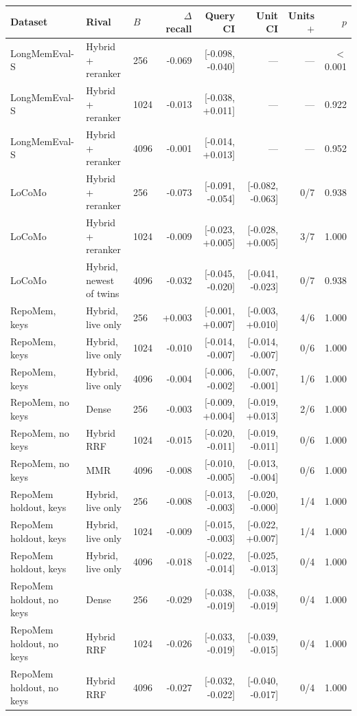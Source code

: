 \begin{tabular}{@{}lllrrrrr@{}}\toprule
Dataset & Rival & $B$ & $\Delta$ recall & Query CI & Unit CI & Units $+$ & $p$ \\\midrule
LongMemEval-S & Hybrid + reranker & 256 & -0.069 & [-0.098, -0.040] & --- & --- & $<$0.001 \\
LongMemEval-S & Hybrid + reranker & 1024 & -0.013 & [-0.038, +0.011] & --- & --- & 0.922 \\
LongMemEval-S & Hybrid + reranker & 4096 & -0.001 & [-0.014, +0.013] & --- & --- & 0.952 \\
\addlinespace
LoCoMo & Hybrid + reranker & 256 & -0.073 & [-0.091, -0.054] & [-0.082, -0.063] & 0/7 & 0.938 \\
LoCoMo & Hybrid + reranker & 1024 & -0.009 & [-0.023, +0.005] & [-0.028, +0.005] & 3/7 & 1.000 \\
LoCoMo & Hybrid, newest of twins & 4096 & -0.032 & [-0.045, -0.020] & [-0.041, -0.023] & 0/7 & 0.938 \\
\addlinespace
RepoMem, keys & Hybrid, live only & 256 & +0.003 & [-0.001, +0.007] & [-0.003, +0.010] & 4/6 & 1.000 \\
RepoMem, keys & Hybrid, live only & 1024 & -0.010 & [-0.014, -0.007] & [-0.014, -0.007] & 0/6 & 1.000 \\
RepoMem, keys & Hybrid, live only & 4096 & -0.004 & [-0.006, -0.002] & [-0.007, -0.001] & 1/6 & 1.000 \\
\addlinespace
RepoMem, no keys & Dense & 256 & -0.003 & [-0.009, +0.004] & [-0.019, +0.013] & 2/6 & 1.000 \\
RepoMem, no keys & Hybrid RRF & 1024 & -0.015 & [-0.020, -0.011] & [-0.019, -0.011] & 0/6 & 1.000 \\
RepoMem, no keys & MMR & 4096 & -0.008 & [-0.010, -0.005] & [-0.013, -0.004] & 0/6 & 1.000 \\
\addlinespace
RepoMem holdout, keys & Hybrid, live only & 256 & -0.008 & [-0.013, -0.003] & [-0.020, -0.000] & 1/4 & 1.000 \\
RepoMem holdout, keys & Hybrid, live only & 1024 & -0.009 & [-0.015, -0.003] & [-0.022, +0.007] & 1/4 & 1.000 \\
RepoMem holdout, keys & Hybrid, live only & 4096 & -0.018 & [-0.022, -0.014] & [-0.025, -0.013] & 0/4 & 1.000 \\
\addlinespace
RepoMem holdout, no keys & Dense & 256 & -0.029 & [-0.038, -0.019] & [-0.038, -0.019] & 0/4 & 1.000 \\
RepoMem holdout, no keys & Hybrid RRF & 1024 & -0.026 & [-0.033, -0.019] & [-0.039, -0.015] & 0/4 & 1.000 \\
RepoMem holdout, no keys & Hybrid RRF & 4096 & -0.027 & [-0.032, -0.022] & [-0.040, -0.017] & 0/4 & 1.000 \\
\bottomrule\end{tabular}